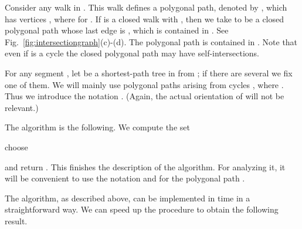 \documentclass[11pt,a4paper]{article}
\begin{document}
Consider any walk  in .
This walk defines a polygonal path, denoted by , 
which has vertices ,
where  for . 
If  is a closed walk with , then we take  to be 
a closed polygonal path whose last edge is , which is contained in .
See Fig.~\ref{fig:intersectiongraph}(c)-(d). 
The polygonal path  is contained in .
Note that even if  is a cycle
the closed polygonal path  may have self-intersections.

For any segment , let  be a shortest-path tree in  from ;
if there are several we fix one of them.
We will mainly use polygonal paths arising from cycles ,
where .
Thus we introduce the notation .
(Again, the actual orientation of  will not be relevant.)

The algorithm is the following. We
compute the set

choose

and return .
This finishes the description of the algorithm.
For analyzing it, it will be convenient to use the notation
 and  for the polygonal path . 

The algorithm, as described above,
can be implemented in  time in a straightforward way.
We can speed up the procedure to obtain the following result.
\end{document}
